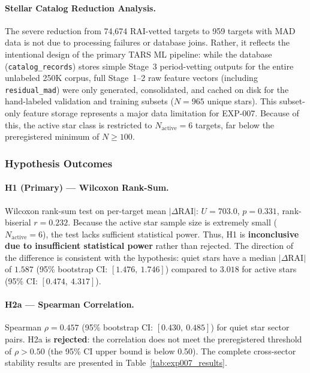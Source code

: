 \paragraph{Stellar Catalog Reduction Analysis.} 
The severe reduction from 74,674 RAI-vetted targets to 959 targets with MAD data is not due to processing failures or database joins. Rather, it reflects the intentional design of the primary TARS ML pipeline: while the database (\texttt{catalog\_records}) stores simple Stage~3 period-vetting outputs for the entire unlabeled 250K corpus, full Stage~1--2 raw feature vectors (including \texttt{residual\_mad}) were only generated, consolidated, and cached on disk for the hand-labeled validation and training subsets ($N=965$ unique stars). This subset-only feature storage represents a major data limitation for EXP-007. Because of this, the active star class is restricted to $N_{\text{active}}=6$ targets, far below the preregistered minimum of $N \geq 100$.

\subsubsection{Hypothesis Outcomes}

\paragraph{H1 (Primary) --- Wilcoxon Rank-Sum.}
Wilcoxon rank-sum test on per-target mean $|\Delta\text{RAI}|$: $U = 703.0$, $p = 0.331$, rank-biserial $r = 0.232$. Because the active star sample size is extremely small ($N_{\text{active}}=6$), the test lacks sufficient statistical power. Thus, H1 is \textbf{inconclusive due to insufficient statistical power} rather than rejected. The direction of the difference is consistent with the hypothesis: quiet stars have a median $|\Delta\text{RAI}|$ of $1.587$ (95\% bootstrap CI: $[1.476,\ 1.746]$) compared to $3.018$ for active stars (95\% CI: $[0.474,\ 4.317]$).

\paragraph{H2a --- Spearman Correlation.}
Spearman $\rho = 0.457$ (95\% bootstrap CI: $[0.430,\ 0.485]$) for quiet star sector pairs. H2a is \textbf{rejected}: the correlation does not meet the preregistered threshold of $\rho > 0.50$ (the 95\% CI upper bound is below 0.50). The complete cross-sector stability results are presented in Table~\ref{tab:exp007_results}.

